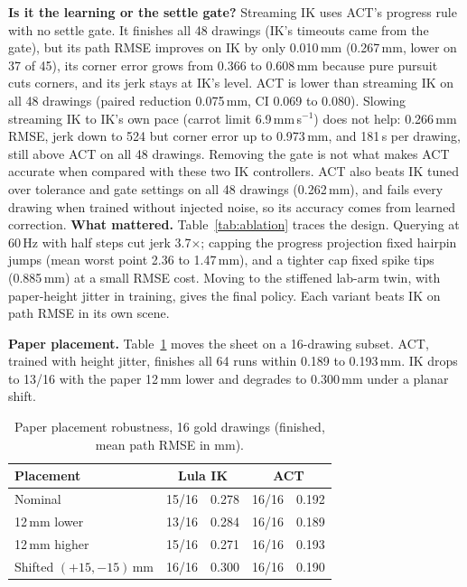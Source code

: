 \documentclass[conference]{IEEEtran}
\newcommand{\mm}{\,mm\xspace}
\begin{document}
\textbf{Is it the learning or the settle gate?} Streaming IK uses ACT's progress rule with no settle gate. It
finishes all 48 drawings (IK's timeouts came from the gate), but its path RMSE improves on IK by only 0.010\mm
(0.267\mm, lower on 37 of 45), its corner error grows from 0.366 to 0.608\mm because pure pursuit cuts corners,
and its jerk stays at IK's level. ACT is lower than streaming IK on all 48 drawings (paired reduction 0.075\mm,
CI 0.069 to 0.080). Slowing streaming IK to IK's own pace (carrot limit 6.9\mm\,s$^{-1}$) does not help:
0.266\mm RMSE, jerk down to 524 but corner error up to 0.973\mm, and 181\,s per drawing, still above ACT on all
48 drawings. Removing the gate is not what makes ACT accurate when compared with these two IK controllers.
ACT also beats IK tuned over tolerance and gate settings on all 48 drawings (0.262\mm), and fails every drawing
when trained without injected noise, so its accuracy comes from learned correction.
\textbf{What mattered.} Table~\ref{tab:ablation} traces the design. Querying at 60\,Hz with half steps cut jerk
3.7$\times$; capping the progress projection fixed hairpin jumps (mean worst point 2.36 to 1.47\mm), and a tighter
cap fixed spike tips (0.885\mm) at a small RMSE cost. Moving to the stiffened lab-arm twin, with paper-height
jitter in training, gives the final policy. Each variant beats IK on path RMSE in its own scene.

\textbf{Paper placement.} Table~\ref{tab:robust} moves the sheet on a 16-drawing subset. ACT, trained with height
jitter, finishes all 64 runs within 0.189 to 0.193\mm. IK drops to 13/16 with the paper 12\mm lower and
degrades to 0.300\mm under a planar shift.

\begin{table}[t]
\centering
\caption{Paper placement robustness, 16 gold drawings (finished, mean path RMSE in mm).}
\label{tab:robust}
\setlength{\tabcolsep}{4pt}
\begin{tabular}{lcccc}
\toprule
Placement & \multicolumn{2}{c}{Lula IK} & \multicolumn{2}{c}{ACT} \\
\midrule
Nominal                & 15/16 & 0.278 & 16/16 & 0.192 \\
12\mm lower            & 13/16 & 0.284 & 16/16 & 0.189 \\
12\mm higher           & 15/16 & 0.271 & 16/16 & 0.193 \\
Shifted $(+15,-15)$\mm & 16/16 & 0.300 & 16/16 & 0.190 \\
\bottomrule
\end{tabular}
\end{table}
\end{document}

